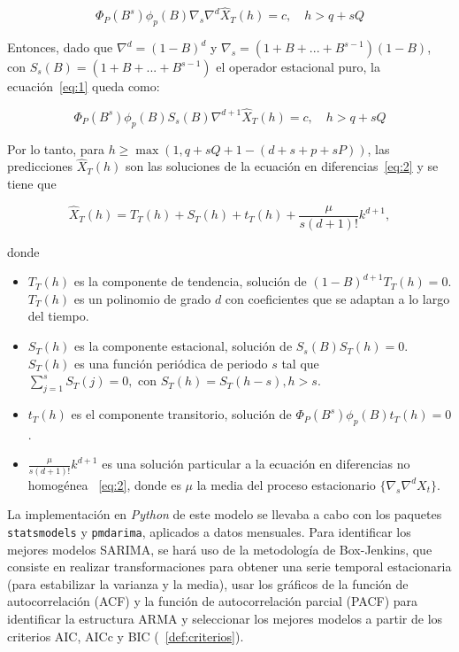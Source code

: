 \documentclass[12pt,twoside]{article}
\begin{document}
\begin{equation}
\label{eq:1}
\Phi_P(B^s)\phi_p(B)\nabla_s \nabla^d \hat{X}_T(h) = c, \quad h > q + sQ
\end{equation}

Entonces, dado que $\nabla^d=(1-B)^d$ y $\nabla_s=(1+B+...+B^{s-1})(1-B)$, con $S_s(B)=(1+B+...+B^{s-1})$ el operador estacional puro, la ecuación~\ref{eq:1} queda como:

\begin{equation}
\label{eq:2}
\Phi_P(B^s)\phi_p(B)S_s(B)\nabla^{d+1} \hat{X}_T(h) = c, \quad h > q + sQ
\end{equation}

Por lo tanto, para $h \geq \max(1, q + sQ + 1 - (d + s + p + sP))$, las predicciones $\hat{X}_T(h)$ son las soluciones de la ecuación en diferencias~\ref{eq:2} y se tiene que

\begin{equation}
\hat{X}_T(h) = T_T(h) + S_T(h) + t_T(h) + \frac{\mu}{s(d+1)!}k^{d+1},
\end{equation}

donde

\begin{itemize}
    \item $T_T(h)$ es la componente de tendencia, solución de $(1-B)^{d+1}T_T(h)=0$. $T_T(h)$ es un polinomio de grado $d$ con coeficientes que se adaptan a lo largo del tiempo.
    \item $S_T(h)$ es la componente estacional, solución de $S_ s(B)S_T(h)=0$. $S_T(h)$ es una función periódica de periodo $s$ tal que $\sum_{j=1}^sS_T(j)=0, \text{ con } S_T(h)=S_T(h-s), h>s$.
    \item $t_T(h)$ es el componente transitorio, solución de $\Phi_P(B^s)\phi_p(B)t_T(h)=0$.
    \item $\frac{\mu}{s(d+1)!}k^{d+1}$ es una solución particular a la ecuación en diferencias no homogénea ~\ref{eq:2}, donde es $\mu$ la media del proceso estacionario $\{\nabla_s\nabla^dX_t\}$.
\end{itemize}

La implementación en \textit{Python} de este modelo se llevaba a cabo con los paquetes \texttt{statsmodels} y  \texttt{pmdarima}, aplicados a datos mensuales. Para identificar los mejores modelos SARIMA, se hará uso de la metodología de Box-Jenkins, que consiste en realizar transformaciones para obtener una serie temporal estacionaria (para estabilizar la varianza y la media), usar los gráficos de la función de autocorrelación (ACF) y la función de autocorrelación parcial (PACF) para identificar la estructura ARMA y seleccionar los mejores modelos a partir de los criterios AIC, AICc y BIC (~\ref{def:criterios}). 
\end{document}
